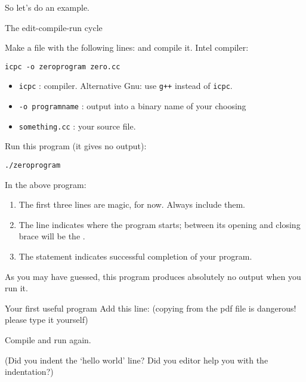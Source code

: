 So let's do an example.

\begin{exercise}{The edit-compile-run cycle}
\label{ex:compile-cycle}

\begin{multicols}{2}
  Make a file  with the following lines:
  and compile it. Intel compiler:
\begin{verbatim}
icpc -o zeroprogram zero.cc
\end{verbatim}
\begin{itemize}
\item \texttt{icpc} : compiler. Alternative Gnu: use \texttt{g++} instead of \texttt{icpc}.
\item \texttt{-o programname} : output into a binary name of your choosing
\item \texttt{something.cc} : your source file.
\end{itemize}

Run this program (it gives no output):
\begin{verbatim}
./zeroprogram
\end{verbatim}
\end{multicols}

\end{exercise}

In the above program:
\begin{enumerate}
\item The first three lines are magic, for now. Always include them.
\item The  line indicates where the program starts; between
  its opening and closing brace will be the
  .
\item The  statement indicates successful completion of your program.
\end{enumerate}
As you may have guessed, this program produces absolutely no output
when you run it.

\begin{exercise}{Your first useful program}
  \label{ex:sayhello}
Add this line:
%
%
(copying from the pdf file is dangerous! please type it yourself)

Compile and run again.

  (Did you indent the `hello world' line? Did you editor help you with
  the indentation?)

\end{exercise}

